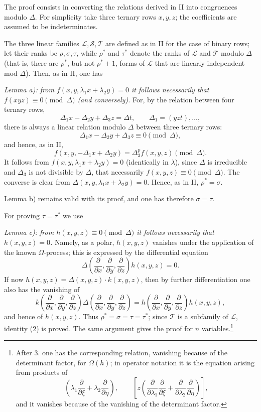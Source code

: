 The proof consists in converting the relations derived in II into congruences modulo $\Delta$. For simplicity take three ternary rows $x,y,z$; the coefficients are assumed to be indeterminates.

The three linear families $\mathcal L,\mathcal S,\mathcal T$ are defined as in II for the case of binary rows; let their ranks be $\rho,\sigma,\tau$, while $\rho^*$ and $\tau^*$ denote the ranks of $\mathcal L$ and $\mathcal T$ modulo $\Delta$ (that is, there are $\rho^*$, but not $\rho^*+1$, forms of $\mathcal L$ that are linearly independent mod $\Delta$). Then, as in II, one has

\emph{Lemma a): from $f(x,y,\lambda_1x+\lambda_2y)=0$ it follows necessarily that $f(xyz)\equiv0\pmod{\Delta}$ (and conversely).} For, by the relation between four ternary rows,
\[
  \Delta_1x-\Delta_2y+\Delta_3z=\Delta t,
  \qquad \Delta_1=(yzt),\ldots,
\]
there is always a linear relation modulo $\Delta$ between three ternary rows:
\[
  \Delta_1x-\Delta_2y+\Delta_3z\equiv0\pmod{\Delta},
\]
and hence, as in II,
\[
  f(x,y,-\Delta_1x+\Delta_2y)=\Delta_3^p f(x,y,z)\pmod{\Delta}.
\]
It follows from $f(x,y,\lambda_1x+\lambda_2y)=0$ (identically in $\lambda$), since $\Delta$ is irreducible and $\Delta_3$ is not divisible by $\Delta$, that necessarily $f(x,y,z)\equiv0\pmod{\Delta}$. The converse is clear from $\Delta(x,y,\lambda_1x+\lambda_2y)=0$. Hence, as in II, $\rho^*=\sigma$.

Lemma b) remains valid with its proof, and one has therefore $\sigma=\tau$.

For proving $\tau=\tau^*$ we use

\emph{Lemma c): from $h(x,y,z)\equiv0\pmod{\Delta}$ it follows necessarily that $h(x,y,z)=0$.} Namely, as a polar, $h(x,y,z)$ vanishes under the application of the known $\Omega$-process; this is expressed by the differential equation
\[
  \Delta\!\left(\frac{\partial}{\partial x},\frac{\partial}{\partial y},\frac{\partial}{\partial z}\right)h(x,y,z)=0.
\]
If now $h(x,y,z)=\Delta(x,y,z)\cdot k(x,y,z)$, then by further differentiation one also has the vanishing of
\[
  k\!\left(\frac{\partial}{\partial x},\frac{\partial}{\partial y},\frac{\partial}{\partial z}\right)
  \Delta\!\left(\frac{\partial}{\partial x},\frac{\partial}{\partial y},\frac{\partial}{\partial z}\right)
  =
  h\!\left(\frac{\partial}{\partial x},\frac{\partial}{\partial y},\frac{\partial}{\partial z}\right)h(x,y,z),
\]
and hence of $h(x,y,z)$. Thus $\rho^*=\sigma=\tau=\tau^*$; since $\mathcal T$ is a subfamily of $\mathcal L$, identity (2) is proved. The same argument gives the proof for $n$ variables.\footnote{After 3. one has the corresponding relation, vanishing because of the determinant factor, for $\Omega(h)$; in operator notation it is the equation arising from products of
\[
 \left(\lambda_1\frac{\partial}{\partial \xi}+\lambda_2\frac{\partial}{\partial \eta}\right),
 \qquad
 \left[z\left(\frac{\partial}{\partial\lambda_1}\frac{\partial}{\partial \xi}
 +\frac{\partial}{\partial\lambda_2}\frac{\partial}{\partial \eta}\right)\right],
\]
and it vanishes because of the vanishing of the determinant factor.}

